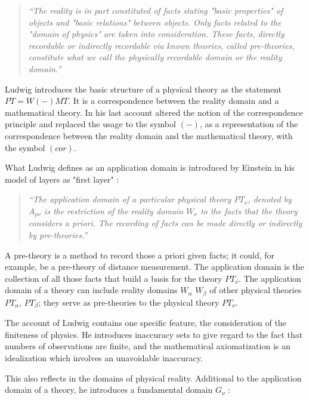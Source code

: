 \documentclass{article}
\begin{document}
\cite[p.3]{ludwig2007new}
\begin{quote}
\textit{``The reality is in part constituted of facts stating "basic properties" of objects and "basic relations" between objects. Only facts related to the "domain of physics" are taken into consideration. These facts, directly recordable or indirectly recordable via known theories, called pre-theories, constitute what we call the physically recordable domain or the reality domain.''}
\end{quote}

Ludwig introduces the basic structure of a physical theory as the statement $PT=W(-)MT$. It is a correspondence between the reality domain and a mathematical theory. In his last account \cite{ludwig2007new} altered the notion of the correspondence principle and replaced the usage to the symbol $(-)$, as a representation of the correspondence between the reality domain and the mathematical theory, with the symbol $(cor)$. 

What Ludwig defines as an application domain is introduced by Einstein in his model of layers as "first layer" \cite[p.12]{ludwig2007new}:

\begin{quote}
\textit{``The application domain of a particular physical theory $PT_\nu$, denoted by $A_{p\nu}$ is the restriction of the reality domain $W_\nu$ to the facts that the theory considers a priori.
The recording of facts can be made directly or indirectly by pre-theories.''}
\end{quote}

A pre-theory is a method to record those a priori given facts; it could, for example, be a pre-theory of distance measurement. The application domain is the collection of all those facts that build a basis for the theory $PT_\nu$. The application domain of a theory can include reality domains $W_\alpha$ $W_\beta$ of other physical theories $PT_\alpha$, $PT_\beta$; they serve as pre-theories to the physical theory $PT_\nu$.

The account of Ludwig contains one specific feature, the consideration of the finiteness of physics. He introduces inaccuracy sets to give regard to the fact that numbers of observations are finite, and the mathematical axiomatization is an idealization which involves an unavoidable inaccuracy. 

This also reflects in the domains of physical reality. Additional to the application domain of a theory, he introduces a fundamental domain $G_\nu$ \cite[p.13]{ludwig2007new}: 
\end{document}
